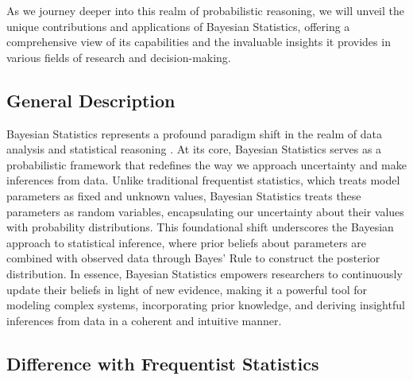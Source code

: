 As we journey deeper into this realm of probabilistic reasoning, we will unveil the unique contributions and applications of Bayesian Statistics, offering a comprehensive view of its capabilities and the invaluable insights it provides in various fields of research and decision-making.

\subsection{General Description}

Bayesian Statistics represents a profound paradigm shift in the realm of data analysis and statistical reasoning \cite{bolstad2016introduction}. At its core, Bayesian Statistics serves as a probabilistic framework that redefines the way we approach uncertainty and make inferences from data. Unlike traditional frequentist statistics, which treats model parameters as fixed and unknown values, Bayesian Statistics treats these parameters as random variables, encapsulating our uncertainty about their values with probability distributions. This foundational shift underscores the Bayesian approach to statistical inference, where prior beliefs about parameters are combined with observed data through Bayes' Rule to construct the posterior distribution. In essence, Bayesian Statistics empowers researchers to continuously update their beliefs in light of new evidence, making it a powerful tool for modeling complex systems, incorporating prior knowledge, and deriving insightful inferences from data in a coherent and intuitive manner.

\subsection{Difference with Frequentist Statistics}

